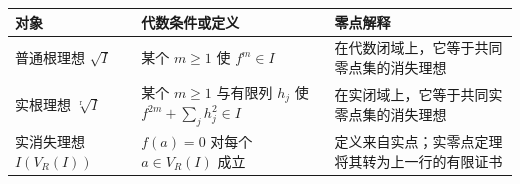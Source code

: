 \begin{tabularx}{\textwidth}{@{}>{\raggedright\arraybackslash}p{}>{\raggedright\arraybackslash}p{}>{\raggedright\arraybackslash}X@{}}
	\toprule
	对象 & 代数条件或定义 & 零点解释 \\
	\midrule
	普通根理想 \(\sqrt I\) & 某个 \(m\ge1\) 使 \(f^m\in I\) & 在代数闭域上，它等于共同零点集的消失理想 \\
	实根理想 \(\sqrt[\mathrm r]{I}\) & 某个 \(m\ge1\) 与有限列 \(h_j\) 使 \(f^{2m}+\sum_jh_j^2\in I\) & 在实闭域上，它等于共同实零点集的消失理想 \\
	实消失理想 \(I(V_R(I))\) & \(f(a)=0\) 对每个 \(a\in V_R(I)\) 成立 & 定义来自实点；实零点定理将其转为上一行的有限证书 \\
	\bottomrule
\end{tabularx}
